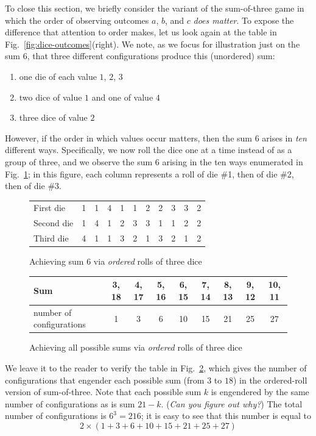 \bigskip

To close this section, we briefly consider the variant of the sum-of-three game in which the order of observing outcomes $a$, $b$, and $c$ {\em does matter}.  To expose the difference that attention to order makes, let us look again at the table in Fig.~\ref{fig:dice-outcomes}(right).  We note, as we focus for illustration just on the sum $6$, that three different configurations produce this (unordered) sum:
\begin{enumerate}
\item one die of each value $1$, $2$, $3$
\medskip\item two dice of value $1$ and one of value $4$
\medskip\item three dice of value $2$
\end{enumerate}
However, if the order in which values occur matters, then the sum $6$ arises in {\em ten} different ways.  Specifically, we now roll the dice one at a time instead of as a group of three, and we observe the sum $6$ arising in the ten ways enumerated in
Fig.~\ref{fig:dice-ordered-outcomes}; in this figure, each column represents a roll of die \#1, then of die \#2, then of die \#3.
\begin{figure}[htb]
\begin{center}
\begin{tabular}{|l||c|c|c|c|c|c|c|c|c|c|}
\hline
First die & 1 & 1 & 4 & 1 & 1 & 2 & 2 & 3 & 3 & 2   \\

Second die & 1 & 4 & 1 & 2 & 3 & 3 & 1 & 1 & 2 & 2   \\

Third die & 4 & 1 & 1 & 3 & 2 & 1 & 3 & 2 & 1 & 2  \\
\hline
\end{tabular}
\end{center}
\caption{Achieving sum $6$ via {\em ordered} rolls of three dice}
\label{fig:dice-ordered-outcomes}
\end{figure}

\medskip

\begin{figure}[htb]
\begin{center}
\begin{tabular}{|l||c|c|c|c|c|c|c|c|}
\hline
Sum & 3, 18 & 4, 17 & 5, 16 & 6, 15 & 7, 14 & 8, 13 & 9, 12 & 10, 11  \\
\hline
number of configurations & 1 & 3 & 6 & 10 & 15 & 21 & 25 & 27  \\
\hline
\end{tabular}
\end{center}
\caption{Achieving all possible sums via {\em ordered} rolls of three dice}
\label{fig:dice-ordered-configs}
\end{figure}
We leave it to the reader to verify the table in Fig.~\ref{fig:dice-ordered-configs}, which gives the number of configurations that engender each possible sum (from $3$ to $18$) in the ordered-roll version of sum-of-three.  Note that each possible sum $k$ is engendered by the same number of configurations as is sum $21- k$.  ({\em Can you figure out why?})  The total number of configurations is $6^3 = 216$; it is easy to see that this number is equal to
\[ 2 \times (1 + 3 + 6 + 10 + 15 + 21 + 25 + 27) \]

